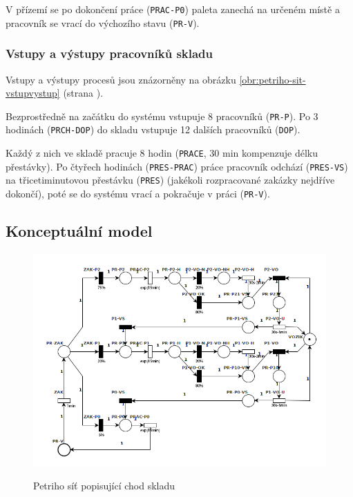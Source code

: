 \documentclass[11pt]{article}
\begin{document}
	V přízemí se po dokončení práce (\texttt{PRAC-P0}) paleta zanechá na určeném místě a pracovník se vrací do výchozího stavu (\texttt{PR-V}).
	
	\subsubsection{Vstupy a výstupy pracovníků skladu}
	Vstupy a výstupy procesů jsou znázorněny na obrázku \ref{obr:petriho-sit-vstupvystup} (strana \pageref{obr:petriho-sit-vstupvystup}).
	
	Bezprostředně na začátku do systému vstupuje 8 pracovníků (\texttt{PR-P}). Po 3 hodinách (\texttt{PRCH-DOP}) do skladu vstupuje 12 dalších pracovníků (\texttt{DOP}).
	
	Každý z nich ve skladě pracuje 8 hodin (\texttt{PRACE}, 30 min kompenzuje délku přestávky).
	Po čtyřech hodinách (\texttt{PRES-PRAC}) práce pracovník odchází (\texttt{PRES-VS}) na třicetiminutovou přestávku (\texttt{PRES}) (jakékoli rozpracované zakázky nejdříve dokončí), poté se do systému vrací a pokračuje v práci (\texttt{PR-V}).
	
	\subsection{Konceptuální model}
	\begin{figure}[h!]
		\caption{Petriho síť popisující chod skladu}
		\centering
		\includegraphics[width=\textwidth]{images/petri_net_sklad.png}
		\label{obr:petriho-sit-sklad}
	\end{figure}
\end{document}
